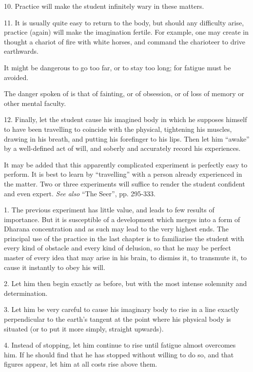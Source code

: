 10. Practice will make the student infinitely wary in these matters.

11. It is usually quite easy to return to the body, but should any difficulty arise, practice (again) will make the imagination fertile. For example, one may create in thought a chariot of fire with white horses, and command the charioteer to drive earthwards.

It might be dangerous to go too far, or to stay too long; for fatigue must be avoided.

The danger spoken of is that of fainting, or of obsession, or of loss of memory or other mental faculty.

12. Finally, let the student cause his imagined body in which he supposes himself to have been travelling to coincide with the physical, tightening his muscles, drawing in his breath, and putting his forefinger to his lips. Then let him \enquote{awake} by a well-defined act of will, and soberly and accurately record his experiences.

It may be added that this apparently complicated experiment is perfectly easy to perform. It is best to learn by \enquote{travelling} with a person already experienced in the matter. Two or three experiments will suffice to render the student confident and even expert. \textit{See also} \enquote{The Seer}, pp. 295-333.




1. The previous experiment has little value, and leads to few results of importance. But it is susceptible of a development which merges into a form of Dharana \textemdash{} concentration \textemdash{} and as such may lead to the very highest ends. The principal use of the practice in the last chapter is to familiarise the student with every kind of obstacle and every kind of delusion, so that he may be perfect master of every idea that may arise in his brain, to dismiss it, to transmute it, to cause it instantly to obey his will.

2. Let him then begin exactly as before, but with the most intense solemnity and determination.

3. Let him be very careful to cause his imaginary body to rise in a line exactly perpendicular to the earth's tangent at the point where his physical body is situated (or to put it more simply, straight upwards).

4. Instead of stopping, let him continue to rise until fatigue almost overcomes him. If he should find that he has stopped without willing to do so, and that figures appear, let him at all costs rise above them.

